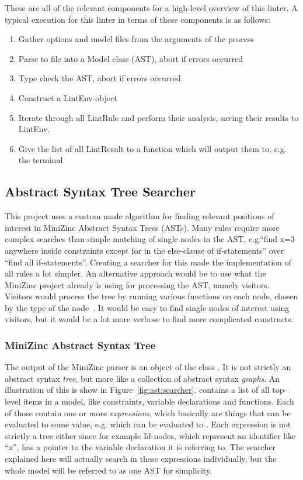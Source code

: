 \documentclass[a4paper,12pt]{article}
\newcommand{\mi}[1]{\mbox{\mzninline{#1}}}
\newcommand{\cpp}[1]{\mbox{\mznfont #1}}
\begin{document}
These are all of the relevant components for a high-level overview of this linter. A
typical execution for this linter in terms of these components is as follows:
\begin{enumerate}
  \item Gather options and model files from the arguments of the process
  \item Parse to file into a \cpp{Model} class (AST), abort if errors occurred
  \item Type check the AST, abort if errors occurred
  \item Construct a \cpp{LintEnv}-object
  \item Iterate through all \cpp{LintRule} and perform their analysis, saving their
  results to \cpp{LintEnv}.
  \item Give the list of all \cpp{LintResult} to a function which will output them to, e.g.\@
  the terminal
\end{enumerate}

\subsection{Abstract Syntax Tree Searcher}\label{sec:searcher}
This project uses a custom made algorithm for finding relevant positions of interest in
MiniZinc Abstract Syntax Trees (ASTs). Many rules require more complex searches than
simple matching of single nodes in the AST, e.g.\@ ``find x=3 anywhere inside constraints
except for in the else-clause of if-statements'' over ``find all if-statements''. Creating
a searcher for this made the implementation of all rules a lot simpler. An alternative
approach would be to use what the MiniZinc project already is using for processing the
AST, namely visitors. Visitors would process the tree by running various functions on each
node, chosen by the type of the node~\cite{DesignPatterns94}. It would be easy to find
single nodes of interest using visitors, but it would be a lot more verbose to find
more complicated constructs.

\subsubsection{MiniZinc Abstract Syntax Tree}


The output of the MiniZinc parser is an object of the class \mi{Model}. It is not strictly
an abstract syntax \emph{tree}, but more like a collection of abstract syntax
\emph{graphs}. An illustration of this is show in Figure~\ref{fig:ast:searcher}.
\mi{Model} contains a list of all top-level items in a model, like constraints, variable
declarations and functions. Each of those contain one or more \emph{expressions}, which
basically are things that can be evaluated to some value, e.g.\@ \mi{1+1} which can be
evaluated to \mi{2}. Each expression is not strictly a tree either since for example
\cpp{Id}-nodes, which represent an identifier like ``x'', has a pointer to the variable
declaration it is referring to. The searcher explained here will actually search in these
expressions individually, but the whole model will be referred to as one AST for
simplicity.
\end{document}
